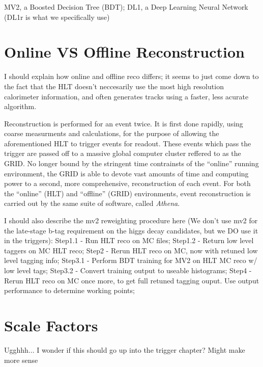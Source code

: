             MV2, a Boosted Decision Tree (BDT);
            DL1, a Deep Learning Neural Network (DL1r is what we specifically use)
            \cite{bjet_id_and_performance}
            \cite{btagging_optimisation}

    \section{Online VS Offline Reconstruction}
        I should explain how online and offline reco differs;
            it seems to just come down to the fact that the HLT doesn't neccesarily use the most high resolution calorimeter information,
            and often generates tracks using a faster, less acurate algorithm.

        Reconstruction is performed for an event twice.
        It is first done rapidly, using coarse measurments and calculations,
            for the purpose of allowing the aforementioned HLT to trigger events for readout.
        These events which pass the trigger are passed off to a massive global computer cluster reffered to as the GRID.
        No longer bound by the stringent time contrainsts of the ``online'' running environment,
            the GRID is able to devote vast amounts of time and computing power to a second, 
            more comprehensive, reconstruction of each event.
        For both the ``online'' (HLT) and ``offline'' (GRID) environments, event reconstruction is carried out by the same suite of software,
            called \textit{Athena}.
            
        I should also describe the mv2 reweighting procedure here
            (We don't use mv2 for the late-stage b-tag requirement on the higgs decay candidates,
            but we DO use it in the triggers):
            Step1.1 - Run HLT reco on MC files;
            Step1.2 - Return low level taggers on MC HLT reco;
            Step2   - Rerun HLT reco on MC, now with retuned low level tagging info;
            Step3.1 - Perform BDT training for MV2 on HLT MC reco w/ low level tags;
            Step3.2 - Convert training output to useable histograms;
            Step4   - Rerun HLT reco on MC once more, to get full retuned tagging ouput. Use output performance to determine working points;


    \section{Scale Factors}
        
        Ugghhh... I wonder if this should go up into the trigger chapter? Might make more sense
